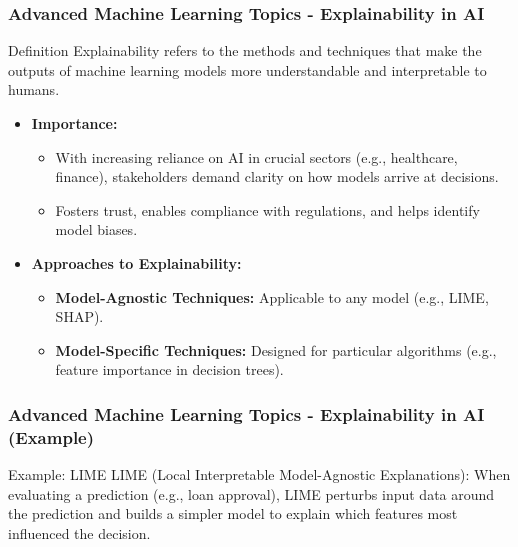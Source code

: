 \documentclass[aspectratio=169]{beamer}
\begin{document}
\begin{frame}[fragile]
  \frametitle{Advanced Machine Learning Topics - Explainability in AI}
  \begin{block}{Definition}
    Explainability refers to the methods and techniques that make the outputs of machine learning models more understandable and interpretable to humans.
  \end{block}
  
  \begin{itemize}
    \item \textbf{Importance:} 
      \begin{itemize}
        \item With increasing reliance on AI in crucial sectors (e.g., healthcare, finance), stakeholders demand clarity on how models arrive at decisions.
        \item Fosters trust, enables compliance with regulations, and helps identify model biases.
      \end{itemize}
    
    \item \textbf{Approaches to Explainability:}
      \begin{itemize}
        \item \textbf{Model-Agnostic Techniques:} Applicable to any model (e.g., LIME, SHAP).
        \item \textbf{Model-Specific Techniques:} Designed for particular algorithms (e.g., feature importance in decision trees).
      \end{itemize}
  \end{itemize}
\end{frame}

\begin{frame}[fragile]
  \frametitle{Advanced Machine Learning Topics - Explainability in AI (Example)}
  \begin{block}{Example: LIME}
    LIME (Local Interpretable Model-Agnostic Explanations): When evaluating a prediction (e.g., loan approval), LIME perturbs input data around the prediction and builds a simpler model to explain which features most influenced the decision.
  \end{block}
\end{frame}
\end{document}
